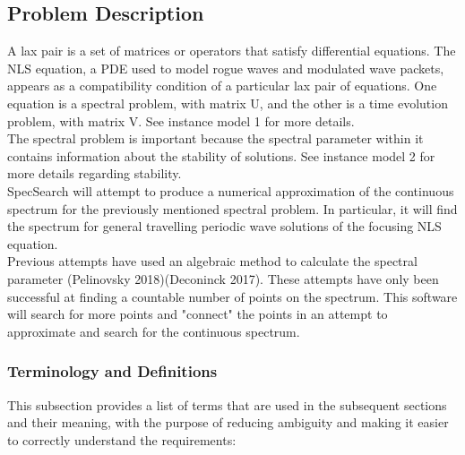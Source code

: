 \documentclass[12pt]{article}
\begin{document}
\subsection{Problem Description} \label{Sec_pd}
A lax pair is a set of matrices or operators that satisfy differential 
equations. The NLS equation, a PDE used to model rogue waves and modulated wave 
packets, appears as a compatibility condition of a particular lax pair of 
equations. One equation is a spectral problem, with matrix U, and the other is 
a time evolution problem, with matrix V. See instance model 1 for more 
details.\\

 The 
spectral problem is important because the spectral 
parameter within it contains information about the stability of solutions. See 
instance model 2 for more details regarding stability.\\

SpecSearch will attempt to produce a numerical approximation of the continuous 
spectrum for the previously mentioned spectral problem. In particular, 
it will find the spectrum for general travelling periodic wave solutions of the 
focusing
NLS equation. \\ 

Previous attempts have used an algebraic method to calculate the spectral 
parameter (Pelinovsky 2018)(Deconinck 2017). These attempts have only been 
successful at finding a countable number of points on the spectrum. This 
software will 
search for more points and "connect" the points in an attempt to approximate 
and search for the continuous spectrum.  

\subsubsection{Terminology and  Definitions}

This subsection provides a list of terms that are used in the subsequent
sections and their meaning, with the purpose of reducing ambiguity and making it
easier to correctly understand the requirements:
\end{document}
